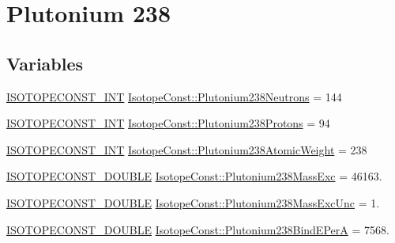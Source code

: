 \hypertarget{group___isotope_const-_plutonium-_pu238}{}\section{Plutonium 238}
\label{group___isotope_const-_plutonium-_pu238}
\subsection*{Variables}
\begin{DoxyCompactItemize}
\item 
\mbox{\hyperlink{group___isotope_const-_macros_ga5f18360b3e99483a35c32d789e62621c}{I\+S\+O\+T\+O\+P\+E\+C\+O\+N\+S\+T\+\_\+\+I\+NT}} \mbox{\hyperlink{group___isotope_const-_plutonium-_pu238_ga09348adf3ecb6da12eaf1c5b5e226c2b}{Isotope\+Const\+::\+Plutonium238\+Neutrons}} = 144
\item 
\mbox{\hyperlink{group___isotope_const-_macros_ga5f18360b3e99483a35c32d789e62621c}{I\+S\+O\+T\+O\+P\+E\+C\+O\+N\+S\+T\+\_\+\+I\+NT}} \mbox{\hyperlink{group___isotope_const-_plutonium-_pu238_ga06787b67eff80f1c4405031f0c8464d9}{Isotope\+Const\+::\+Plutonium238\+Protons}} = 94
\item 
\mbox{\hyperlink{group___isotope_const-_macros_ga5f18360b3e99483a35c32d789e62621c}{I\+S\+O\+T\+O\+P\+E\+C\+O\+N\+S\+T\+\_\+\+I\+NT}} \mbox{\hyperlink{group___isotope_const-_plutonium-_pu238_ga8550db057cc932e15a55c7581553ec18}{Isotope\+Const\+::\+Plutonium238\+Atomic\+Weight}} = 238
\item 
\mbox{\hyperlink{group___isotope_const-_macros_ga8f45a7272ce02c0b4c65c44636ed719a}{I\+S\+O\+T\+O\+P\+E\+C\+O\+N\+S\+T\+\_\+\+D\+O\+U\+B\+LE}} \mbox{\hyperlink{group___isotope_const-_plutonium-_pu238_ga06b5e3011885bae8b1fc07cb8c1fcb2b}{Isotope\+Const\+::\+Plutonium238\+Mass\+Exc}} = 46163.
\item 
\mbox{\hyperlink{group___isotope_const-_macros_ga8f45a7272ce02c0b4c65c44636ed719a}{I\+S\+O\+T\+O\+P\+E\+C\+O\+N\+S\+T\+\_\+\+D\+O\+U\+B\+LE}} \mbox{\hyperlink{group___isotope_const-_plutonium-_pu238_ga89f40b327d0eeaa9a03ec8b6bcbc3948}{Isotope\+Const\+::\+Plutonium238\+Mass\+Exc\+Unc}} = 1.
\item 
\mbox{\hyperlink{group___isotope_const-_macros_ga8f45a7272ce02c0b4c65c44636ed719a}{I\+S\+O\+T\+O\+P\+E\+C\+O\+N\+S\+T\+\_\+\+D\+O\+U\+B\+LE}} \mbox{\hyperlink{group___isotope_const-_plutonium-_pu238_ga5af19e832913c8a479dda0e130eed25f}{Isotope\+Const\+::\+Plutonium238\+Bind\+E\+PerA}} = 7568.
\item 

\end{DoxyCompactItemize}

